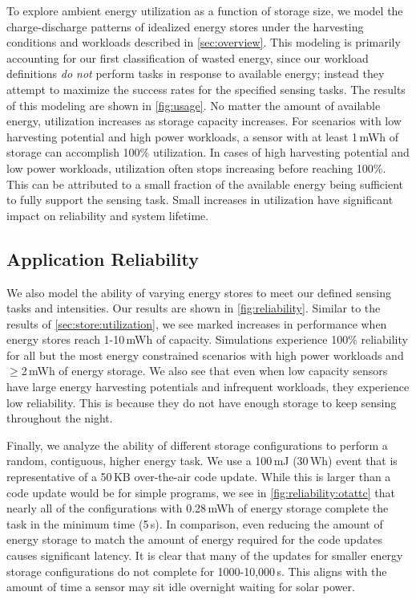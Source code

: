 To explore ambient energy utilization as a function of storage size, we
model the charge-discharge patterns of idealized energy stores under
the harvesting conditions and workloads described in \cref{sec:overview}.
This modeling is primarily accounting for our first classification of
wasted energy, since our workload definitions \textit{do not} perform
tasks in response to available energy; instead they attempt to maximize the success
rates for the specified sensing tasks.
The results of this modeling are shown in \cref{fig:usage}. No matter
the amount of available energy, utilization increases as
storage capacity increases. For scenarios with low harvesting potential and high
power workloads, a sensor with at least 1\,mWh of storage can accomplish 100\% utilization.
In cases of
high harvesting potential and low power workloads, utilization often
stops increasing before reaching 100\%. This
can be attributed to a small fraction of the available energy being sufficient
to fully support the sensing task.
Small increases in utilization
have significant impact on reliability and system lifetime.

\subsection{Application Reliability}
\label{sec:store:reliability}

We also model the ability of varying energy stores to meet our defined
sensing tasks and intensities. Our results are
shown in \cref{fig:reliability}. 
Similar to the results of \cref{sec:store:utilization}, we see marked
increases in performance when energy stores reach 1-10\,mWh
of capacity.
Simulations experience 100\% reliability for all but
the most energy constrained scenarios with high power workloads and
$\geq$2\,mWh of energy storage.
We also see that even when low capacity sensors
have large energy harvesting potentials and infrequent workloads, they experience low
reliability.
This is because they
do not have enough storage to keep sensing throughout the night.

Finally, we analyze the ability of different storage configurations to perform a
random, contiguous, higher energy task. We use a 100\,mJ (30\,\textmu Wh) event that is representative of a
50\,KB over-the-air code update. While this is larger than a code update would be
for simple programs,
we see in \cref{fig:reliability:otattc} that nearly all of the configurations with
0.28\,mWh of energy storage complete the task in the minimum time (5\,s). In comparison,
even reducing the amount of energy storage to match the amount of energy
required for the code updates causes significant latency. It is clear that
many of the updates for smaller energy storage configurations
do not complete for 1000-10,000\,s.
This aligns with the amount of time a sensor may sit
idle overnight waiting for solar power.

